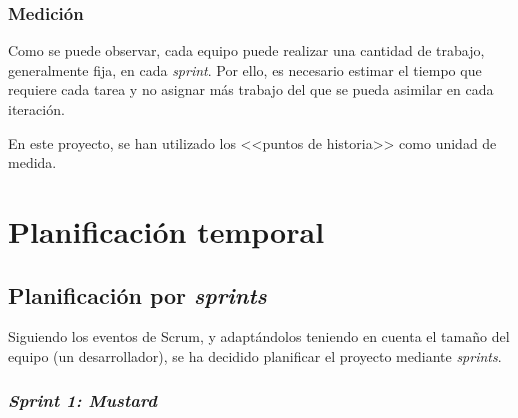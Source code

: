 \subsubsection{Medición}

Como se puede observar, cada equipo puede realizar una cantidad de trabajo, generalmente fija, en cada \textit{sprint}. Por ello, es necesario estimar el tiempo que requiere cada tarea y no asignar más trabajo del que se pueda asimilar en cada iteración.

En este proyecto, se han utilizado los <<puntos de historia>> como unidad de medida.


\section{Planificación temporal}
\label{s:temp}

\subsection{Planificación por \textit{sprints}}
\label{s:planificacion-sprints}
Siguiendo los eventos de Scrum, y adaptándolos teniendo en cuenta el tamaño del equipo (un desarrollador), se ha decidido planificar el proyecto mediante \textit{sprints}.

\subsubsection{\textit{Sprint 1: Mustard}}

